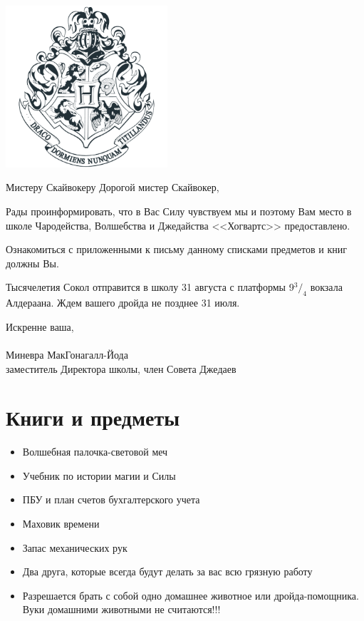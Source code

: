 \documentclass[14pt,a4paper]{extreport}
\newcommand{\fr}[2]{\ensuremath{^#1/_#2}}
\begin{document}
\thispagestyle{plain}
\begin{center}
{\includegraphics[height=6cm]{Hogwarts.png}}
\end{center}
\vskip 1cm
\small {Мистеру Скайвокеру}
\vskip 2.5cm
\noindent
\normalsize
Дорогой мистер Скайвокер,
\par
Рады проинформировать, что в Вас Силу чувствуем мы и поэтому Вам место  в школе Чародейства, Волшебства и Джедайства  <<Хогвартс>> предоставлено.
\par
Ознакомиться с приложенными к письму данному списками предметов и книг должны Вы.
\par
Тысячелетия Сокол отправится в школу 31 августа с платформы 9\fr{3}{4} вокзала Алдераана. Ждем вашего дройда не позднее 31 июля.
\par 
Искренне ваша, \\ {} \\
Миневра МакГонагалл-Йода \\ заместитель Директора школы, член Совета Джедаев 

\newpage

\section{Книги и предметы}
\begin{itemize}
\item Волшебная палочка-световой меч
\item Учебник по истории магии и Силы
\item ПБУ и план счетов бухгалтерского учета
\item Маховик времени
\item Запас механических рук
\item Два друга, которые всегда будут делать за вас всю грязную работу
\item Разрешается брать с собой одно домашнее животное или дройда-помощника. Вуки домашними животными не считаются!!!
\end{itemize}
\end{document}
